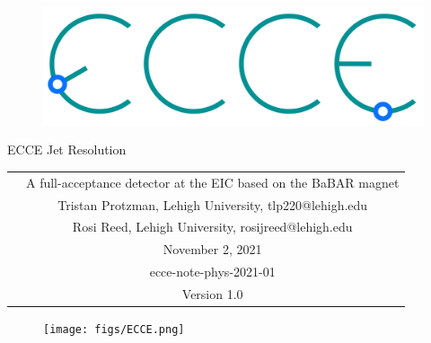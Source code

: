 \renewcommand*\familydefault{\sfdefault}
{\sffamily
\vfill
\vspace{4cm}
\begin{figure}[H]
  \begin{center}
  \includegraphics[width=0.3\linewidth]{figs/ecce-logo.png}
\end{center}
\end{figure}

\begin{center}
  \large
  {\LARGE{ECCE Jet Resolution}}
  \begin{tabular}{cc}
&A full-acceptance detector at the EIC based on the BaBAR magnet \\
&Tristan Protzman, Lehigh University, tlp220@lehigh.edu\\
&Rosi Reed, Lehigh University, rosijreed@lehigh.edu\\
&November 2, 2021 \\
&ecce-note-phys-2021-01\\
&Version 1.0
 \end{tabular}
  \end{center}
\vspace{1cm}

\begin{figure}[H]
  \begin{center}
    \texttt{[image: figs/ECCE.png]}
  \end{center}
\end{figure}
}


\renewcommand*\familydefault{\rmdefault}

